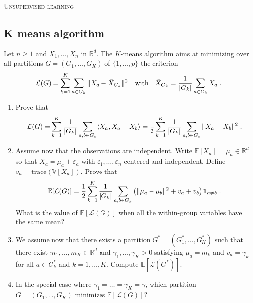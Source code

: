 \documentclass[a4paper,10pt,fleqn]{article}
\newcommand{\R}{\ensuremath{\mathbb{R}}}
\newcommand{\E}{\ensuremath{\mathbb{E}}}
\newcommand{\V}{\ensuremath{\mathbb{V}}}
\newcommand{\1}{\ensuremath{\mathbbm{1}}}
\newcommand{\eps}{\varepsilon}
\newcommand{\crit}{\mathcal{L}}
\begin{document}
\noindent\hrulefill

\begin{center}
\textsc{Unsupervised learning}
\end{center}
\hrulefill

\medskip


\subsection*{K means algorithm}
Let $n\geqslant 1$ and  $X_{1},\ldots,X_{n}$ in $\R^d$.
The $K$-means algorithm aims at minimizing over all partitions $G=(G_{1},\ldots,G_{K})$ of $\{1,\ldots,p\}$ the criterion
$$
\crit(G)=\sum_{k=1}^K\sum_{a\in G_{k}}\|X_{a}-\bar{X}_{G_{k}}\|^2\quad \textrm{with}\quad \bar{X}_{G_{k}}={1\over |G_{k}|}\sum_{a\in G_{k}} X_{a}\;.
$$
\begin{enumerate}
\item Prove that
$$
\crit(G)=\sum_{k=1}^K{1\over |G_{k}|}\sum_{a,b\in G_{k}} \langle X_{a},X_{a}-X_{b}\rangle ={1\over 2}\sum_{k=1}^K{1\over |G_{k}|}\sum_{a,b\in G_{k}} \|X_{a}-X_{b}\|^2\;.
$$
\item Assume now that the observations are independent. Write $\E[X_a] = \mu_{a}\in\R^d$ so that $X_{a}=\mu_{a}+\eps_{a}$ with $\eps_{1},\ldots,\eps_{n}$ centered and independent. Define $v_{a}=\textrm{trace}(\V[X_{a}])$. Prove that
$$
\E[\crit(G)]={1\over 2}\sum_{k=1}^K{1\over |G_{k}|}\sum_{a,b\in G_{k}} \left(\|\mu_{a}-\mu_{b}\|^2+v_{a}+v_{b}\right){\bf 1}_{a\neq b}\;.
$$
What is the value of $\E[\crit(G)]$ when all the within-group variables have the same mean?
\item We assume now that there exists a partition $G^*=(G^*_{1},\ldots,G^*_{K})$ such  that there exist $m_{1},\ldots,m_{K}\in\R^d$ and $\gamma_{1},\ldots,\gamma_{K}>0$ satisfying
$\mu_{a}=m_{k}$ and $v_{a}=\gamma_{k}$ for all $a\in G^*_{k}$ and $k=1,\ldots,K$. Compute $\E[\crit(G^*)]$.
\item In the special case where $\gamma_{1}=\ldots=\gamma_{K}=\gamma$, which partition $G=(G_{1},\ldots,G_{K})$ minimizes $\E[\crit(G)]$?
\end{enumerate}
	
	
\end{document}
